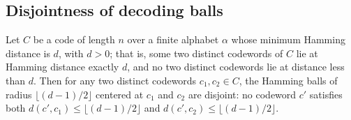 \subsection{Disjointness of decoding balls}

\begin{lemma}
\label{ErrorCorrectingCodes.Codeword.hamming_ball_non_intersect}
\leanok
{}
Let $C$ be a code of length $n$ over a finite alphabet $\alpha$ whose minimum Hamming
distance is $d$, with $d > 0$; that is, some two distinct codewords of $C$ lie at
Hamming distance exactly $d$, and no two distinct codewords lie at distance less than
$d$. Then for any two distinct codewords $c_1, c_2 \in C$, the Hamming balls of radius
$\lfloor (d-1)/2 \rfloor$ centered at $c_1$ and $c_2$ are disjoint: no codeword $c'$
satisfies both $d(c', c_1) \le \lfloor (d-1)/2 \rfloor$ and $d(c', c_2) \le \lfloor
(d-1)/2 \rfloor$.
\end{lemma}

